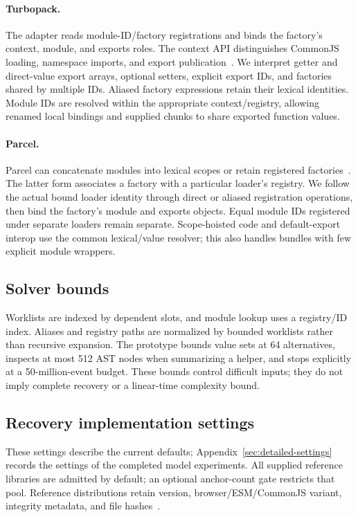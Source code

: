 \paragraph{Turbopack.}
The adapter reads module-ID/factory registrations and binds the factory's context, module, and exports roles. The context API distinguishes CommonJS loading, namespace imports, and export publication~\cite{turbopackRuntime}. We interpret getter and direct-value export arrays, optional setters, explicit export IDs, and factories shared by multiple IDs. Aliased factory expressions retain their lexical identities. Module IDs are resolved within the appropriate context/registry, allowing renamed local bindings and supplied chunks to share exported function values.

\paragraph{Parcel.}
Parcel can concatenate modules into lexical scopes or retain registered factories~\cite{parcelScopeHoisting}. The latter form associates a factory with a particular loader's registry. We follow the actual bound loader identity through direct or aliased registration operations, then bind the factory's module and exports objects. Equal module IDs registered under separate loaders remain separate. Scope-hoisted code and default-export interop use the common lexical/value resolver; this also handles bundles with few explicit module wrappers.

\subsection{Solver bounds}
Worklists are indexed by dependent slots, and module lookup uses a registry/ID index. Aliases and registry paths are normalized by bounded worklists rather than recursive expansion. The prototype bounds value sets at 64 alternatives, inspects at most 512 AST nodes when summarizing a helper, and stops explicitly at a 50-million-event budget. These bounds control difficult inputs; they do not imply complete recovery or a linear-time complexity bound.


\subsection{Recovery implementation settings}
\label{sec:recovery-implementation}
These settings describe the current defaults; Appendix~\ref{sec:detailed-settings} records the settings of the completed model experiments. All supplied reference libraries are admitted by default; an optional anchor-count gate restricts that pool. Reference distributions retain version, browser/ESM/CommonJS variant, integrity metadata, and file hashes~\cite{npmpack}.


